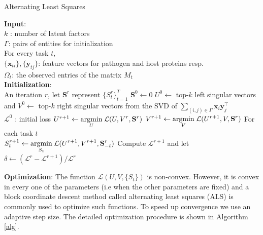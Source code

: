 \documentclass{bioinfo}
\newcommand{\argmin}{\operatornamewithlimits{argmin}}
\begin{document}
\begin{algorithm}[!t]   \caption{Alternating Least Squares}
   \label{alg}
   \begin{small}
\begin{algorithmic}[1]
\STATE \textbf{Input}: \\
$k$ : number of latent factors\\
$\Gamma$: pairs of entities for initialization\\
For every task $t$,\\
${\{\mathbf{x}_{ti}\}, \{\mathbf{y}_{tj}\}}$: feature vectors for pathogen and host proteins resp.\\
$\Omega_t$: the observed entries of the matrix $M_t$\\
\STATE \textbf{Initialization}: \\
\STATE An iteration $r$, let $\mathbf{S}^r$ represent $\{S^r_t\}_{t=1}^T$
\STATE $\mathbf{S}^0 \leftarrow 0$
\STATE $U^0 \leftarrow$ top-$k$ left singular vectors and $V^0 \leftarrow$ top-$k$ right singular vectors from the SVD of $\displaystyle{\sum_{(i,j) \in \Gamma}} \mathbf{x}_i \mathbf{y}_j^\intercal$\\
\STATE $\mathcal{L}^0$ : initial loss
\REPEAT
  \STATE $U^{r+1} \leftarrow \displaystyle{\argmin_{U}} \; \mathcal{L}(U, V^r, \mathbf{S}^r)$  \STATE $V^{r+1} \leftarrow \displaystyle{\argmin_{V}} \; \mathcal{L}(U^{r+1}, V, \mathbf{S}^r) $  \STATE For each task $t$\\
  \hspace{0.5cm} $S^{r+1}_t \leftarrow \displaystyle{\argmin_{S_t}} \; \mathcal{L}(U^{r+1}, V^{r+1}, \mathbf{S}^r_{-t}) $
  \STATE Compute $\mathcal{L}^{r+1}$ and let $\delta \leftarrow (\mathcal{L}^r - \mathcal{L}^{r+1})/\mathcal{L}^r$
\UNTIL {$\delta < \tau$}%
\end{algorithmic}\end{small}
\end{algorithm}



\noindent \textbf{Optimization}:
The function $\mathcal{L}(U, V, \{S_t\})$ is non-convex. However, it is convex in every one of the parameters (i.e when the other parameters are fixed) 
and a block coordinate descent method called alternating least squares (ALS) is commonly used to optimize such functions. 
To speed up convergence we use an adaptive step size. The detailed optimization procedure is shown in Algorithm \ref{alg}. 
\end{document}

